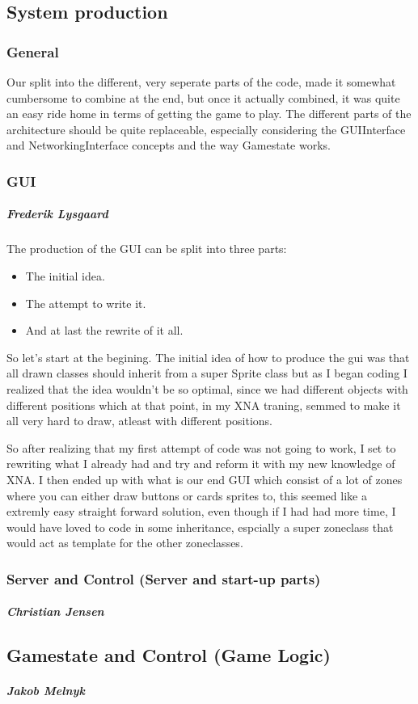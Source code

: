 \subsection{System production}
\subsubsection{General}
Our split into the different, very seperate parts of the code, made it somewhat cumbersome to combine at the end, but once it actually combined, it was quite an easy ride home in terms of getting the game to play. The different parts of the architecture should be quite replaceable, especially considering the GUIInterface and NetworkingInterface concepts and the way Gamestate works.
\subsubsection{GUI}
\subparagraph{Frederik Lysgaard}
The production of the GUI can be split into three parts:
\begin{itemize}
\item The initial idea.
\item The attempt to write it.
\item  And at last the rewrite of it all.
\end{itemize}
So let's start at the begining. The initial idea of how to produce the gui was that all drawn classes should inherit from a super Sprite class but as I began coding I realized that the idea wouldn't be so optimal, since we had different objects with different positions which at that point, in my XNA traning, semmed to make it all very hard to draw, atleast with different positions.

So after realizing that my first attempt of code was not going to work, I set to rewriting what I already had and try and reform it with my new knowledge of XNA.
I then ended up with what is our end GUI which consist of a lot of zones where you can either draw buttons or cards sprites to, this seemed like a extremly easy straight forward solution, even though if I had had more time, I would have loved to code in some inheritance, espcially a super zoneclass that would act as template for the other zoneclasses.

\subsubsection{Server and Control (Server and start-up parts)}
\subparagraph{Christian Jensen}

\subsection{Gamestate and Control (Game Logic)}
\subparagraph{Jakob Melnyk}
